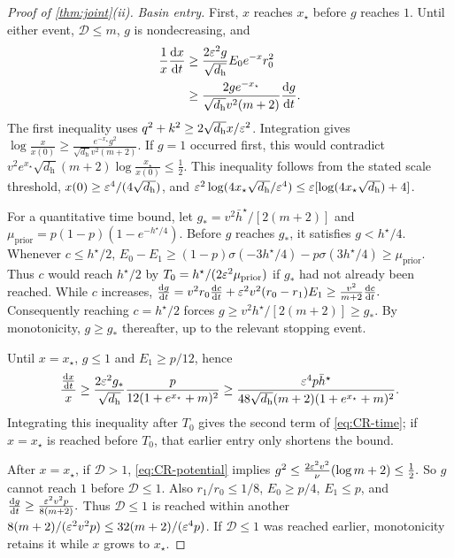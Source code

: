 \begin{proof}[Proof of \cref{thm:joint}(ii)]
\emph{Basin entry.}
First, $x$ reaches $x_\star$ before $g$ reaches $1$. Until either event, $\mathcal D\le m$, $g$ is nondecreasing, and
\begin{align*}
 \frac1x\ddt{x}&\ge\frac{2\initscale^2g}{\sqrt{d_{\mathrm h}}}E_0e^{-x}r_0^2\\
 &\ge\frac{2ge^{-x_\star}}{\sqrt{d_{\mathrm h}}v^2(m+2)}\ddt{g}.
\end{align*} 
The first inequality uses $q^2+k^2\ge2\sqrt{d_{\mathrm h}}x/\varepsilon^2$.
Integration gives
 $\log\frac{x}{x(0)}\ge\frac{e^{-x_\star}g^2}{\sqrt{d_{\mathrm h}}v^2(m+2)}.$ 
If $g=1$ occurred first, this would contradict
 $v^2e^{x_\star}\sqrt{d_{\mathrm h}}(m+2)\log\frac{x_\star}{x(0)}\le\frac12.$ 
This inequality follows from the stated scale threshold, $x(0)\ge\varepsilon^4/(4\sqrt{d_{\mathrm h}})$, and
$\varepsilon^2\log(4x_\star\sqrt{d_{\mathrm h}}/\varepsilon^4)\le\varepsilon[\log(4x_\star\sqrt{d_{\mathrm h}})+4]$.

For a quantitative time bound, let $g_*=v^2\bar h^\star/[2(m+2)]$ and
$\mu_{\mathrm{prior}}=p(1-p)(1-e^{-h^\star/4})$.
Before $g$ reaches $g_*$, it satisfies $g<h^\star/4$. Whenever $c\le h^\star/2$,
 $E_0-E_1\ge(1-p)\sigma(-3h^\star/4)-p\sigma(3h^\star/4)\ge\mu_{\mathrm{prior}}.$ 
Thus $c$ would reach $h^\star/2$ by $T_0=h^\star/(2\varepsilon^2\mu_{\mathrm{prior}})$ if $g_*$ had not already been reached.
While $c$ increases,
 $\ddt{g}=v^2r_0\ddt{c}+\initscale^2v^2(r_0-r_1)E_1\ge\frac{v^2}{m+2}\ddt{c}.$ 
Consequently reaching $c=h^\star/2$ forces $g\ge v^2h^\star/[2(m+2)]\ge g_*$.
By monotonicity, $g\ge g_*$ thereafter, up to the relevant stopping event.

Until $x=x_\star$, $g\le1$ and $E_1\ge p/12$, hence
\[
 \frac{\ddt{x}}{x}\ge\frac{2\initscale^2g_*}{\sqrt{d_{\mathrm h}}}
       \frac{p}{12(1+e^{x_\star}+m)^2}
 \ge\frac{\initscale^4p\bar h^\star}{48\sqrt{d_{\mathrm h}}(m+2)(1+e^{x_\star}+m)^2}.
\]
Integrating this inequality after $T_0$ gives the second term of \cref{eq:CR-time}; if $x=x_\star$ is reached before $T_0$,
that earlier entry only shortens the bound.

After $x=x_\star$, if $\mathcal D>1$, \eqref{eq:CR-potential} implies
 $g^2\le\frac{2\varepsilon^2v^2}{\nu}(\log m+2)\le\frac12.$ 
So $g$ cannot reach $1$ before $\mathcal D\le1$. Also $r_1/r_0\le1/8$, $E_0\ge p/4$, $E_1\le p$, and
 $\ddt{g}\ge\frac{\initscale^2v^2 p}{8(m+2)}.$ 
Thus $\mathcal D\le1$ is reached within another $8(m+2)/(\varepsilon^2v^2 p)\le32(m+2)/(\varepsilon^4p)$.
If $\mathcal D\le1$ was reached earlier, monotonicity retains it while $x$ grows to $x_\star$.


\end{proof}
